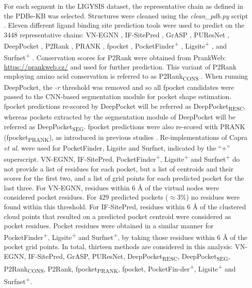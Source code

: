 For each segment in the LIGYSIS dataset, the representative chain as defined in the PDBe-KB was selected. Structures were cleaned using the \textit{clean\_pdb.py} script \cite{JUBB_2019_PDBTOOLS}. Eleven different ligand binding site prediction tools were used to predict on the 3448 representative chains: VN-EGNN \cite{SESTAK_2024_VNEGNN}, IF-SitePred \cite{CARBERY_2024_IFSP}, GrASP \cite{SMITH_2024_GrASP}, PUResNet \cite{KANDEL_2021_PURESNET, KANDEL_2024_PURESNET}, DeepPocket \cite{AGGARWAL_2022_DEEPPOCKET}, P2Rank \cite{KRIVAK_2015_P2RANK, KRIVAK_2018_P2RANK}, PRANK \cite{KRIVAK_2015_PRANK}, fpocket \cite{GUILLOUX_2009_FPOCKET, SCHMIDTKE_2010_FPOCKET2}, PocketFinder\textsuperscript{+} \cite{AN_2005_POCKETFINDER}, Ligsite\textsuperscript{+} \cite{HENDLICH_1997_LIGSITE}, and Surfnet\textsuperscript{+} \cite{LASKOWSKI_1995_SURFNET}. Conservation scores for P2Rank were obtained from PrankWeb: \url{https://prankweb.cz/} and used for further prediction. This variant of P2Rank employing amino acid conservation is referred to as P2Rank\textsubscript{CONS} \cite{JENDELE_2019_PRANKWEB, JAKUBEC_2022_PRANKWEB}. When running DeepPocket, the \textit{-r} threshold was removed and so all fpocket candidates were passed to the CNN-based segmentation module for pocket shape estimation. fpocket predictions re-scored by DeepPocket will be referred as DeepPocket\textsubscript{RESC}, whereas pockets extracted by the segmentation module of DeepPocket will be referred as DeepPocket\textsubscript{SEG}. fpocket predictions were also re-scored with PRANK \cite{KRIVAK_2015_PRANK} (fpocket\textsubscript{PRANK}), as introduced in previous studies \cite{KRIVAK_2015_PRANK, KRIVAK_2015_P2RANK, KRIVAK_2018_P2RANK, COMAJUNCOSA_2024_POCKETS}. Re-implementations of Capra \textit{et al.} \cite{CAPRA_2009_CONCAVITY} were used for PocketFinder, Ligsite and Surfnet, indicated by the ``+'' superscript. VN-EGNN, IF-SitePred, PocketFinder\textsuperscript{+}, Ligsite\textsuperscript{+} and Surfnet\textsuperscript{+} do not provide a list of residues for each pocket, but a list of centroids and their scores for the first two, and a list of grid points for each predicted pocket for the last three. For VN-EGNN, residues within 6 \AA{} of the virtual nodes were considered pocket residues. For 429 predicted pockets ($\approx$3\%) no residues were found within this threshold. For IF-SitePred, residues within 6 \AA{} of the clustered cloud points that resulted on a predicted pocket centroid were considered as pocket residues. Pocket residues were obtained in a similar manner for PocketFinder\textsuperscript{+}, Ligsite\textsuperscript{+} and Surfnet\textsuperscript{+}, by taking those residues within 6 \AA{} of the pocket grid points. In total, thirteen methods are considered in this analysis: VN-EGNN, IF-SitePred, GrASP, PUResNet, DeepPocket\textsubscript{RESC}, DeepPocket\textsubscript{SEG}, P2Rank\textsubscript{CONS}, P2Rank, fpocket\textsubscript{PRANK}, fpocket, PocketFin-der\textsuperscript{+}, Ligsite\textsuperscript{+} and Surfnet\textsuperscript{+}.

